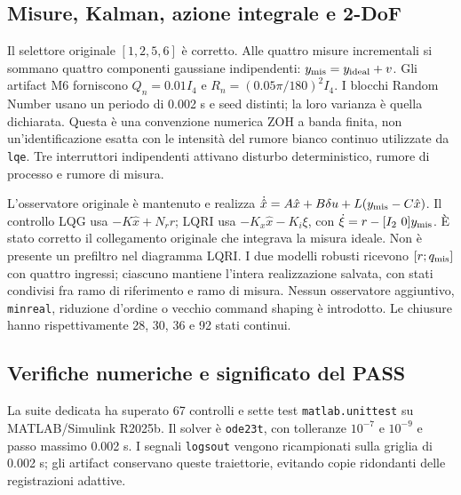 \subsection{Misure, Kalman, azione integrale e 2-DoF}
Il selettore originale $[1,2,5,6]$ è corretto. Alle quattro misure
incrementali si sommano quattro componenti gaussiane indipendenti:
$y_{\rm mis}=y_{\rm ideal}+v$. Gli artifact M6 forniscono
$Q_n=0.01 I_4$ e $R_n=(0.05\pi/180)^2I_4$.
I blocchi Random Number usano un periodo di 0.002 s e seed distinti;
la loro varianza è quella dichiarata. Questa è una convenzione numerica
ZOH a banda finita, non un'identificazione esatta con le intensità del
rumore bianco continuo utilizzate da \texttt{lqe}.
Tre interruttori indipendenti attivano disturbo deterministico, rumore di
processo e rumore di misura.

L'osservatore originale è mantenuto e realizza
$\dot{\hat x}=A\hat x+B\delta u+L(y_{\rm mis}-C\hat x)$.
Il controllo LQG usa $-K\hat x+N_rr$; LQRI usa
$-K_x\hat x-K_i\xi$, con $\dot\xi=r-[I_2\ 0]y_{\rm mis}$.
È stato corretto il collegamento originale che integrava la misura ideale.
Non è presente un prefiltro nel diagramma LQRI.
I due modelli robusti ricevono $[r;q_{\rm mis}]$ con quattro ingressi;
ciascuno mantiene l'intera realizzazione salvata, con stati condivisi fra
ramo di riferimento e ramo di misura. Nessun osservatore aggiuntivo,
\texttt{minreal}, riduzione d'ordine o vecchio command shaping è introdotto.
Le chiusure hanno rispettivamente 28, 30, 36 e 92 stati continui.

\subsection{Verifiche numeriche e significato del PASS}
La suite dedicata ha superato 67 controlli e sette test
\texttt{matlab.unittest} su MATLAB/Simulink R2025b.
Il solver è \texttt{ode23t}, con tolleranze $10^{-7}$ e $10^{-9}$ e passo
massimo 0.002 s. I segnali \texttt{logsout} vengono ricampionati sulla
griglia di 0.002 s; gli artifact conservano queste traiettorie, evitando
copie ridondanti delle registrazioni adattive.

